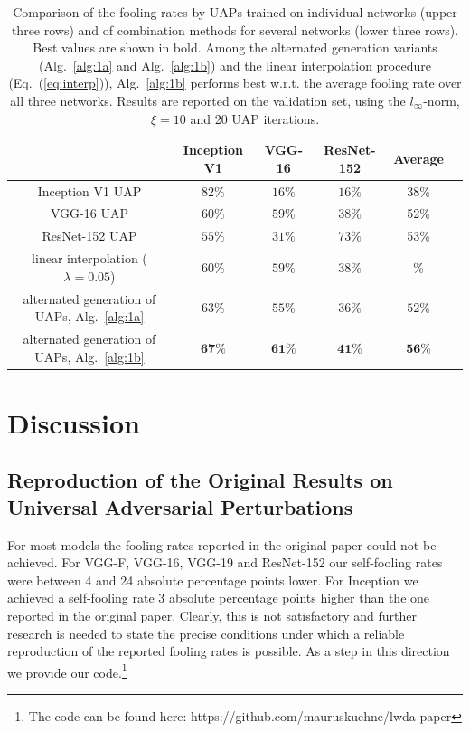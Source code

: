 \documentclass[runningheads]{llncs}
\begin{document}
\begin{table}
\centering

\begin{tabular}{|c|c|c|c|c|c|}
\hline
											&	Inception	V1&	VGG-16		&	ResNet-152	& Average	\\ \hline
Inception V1 UAP							&	\(82\%\)		&	\(16\%\)	&	\(16\%\)	&38\%	\\
VGG-16 UAP								&	\(60\%\)		&	\(59\%\)	&	\(38\%\)	&52\%	\\
ResNet-152 UAP &	\(55\%\)		&	\(31\%\)	&	\(73\%\)&53\%		\\ \hline
linear interpolation (\(\lambda=0.05\))	&	\(60\%\)		&	\(59\%\)	&	\(38\%\)	&\%\\
alternated generation of UAPs, Alg.~\ref{alg:1a}&	\(63\%\)		&	\(55\%\)	&	\(36\%\)	& \(52\%\)	\\
alternated generation of UAPs, Alg.~\ref{alg:1b}&	\(\mathbf{67}\%\)		&	\(\mathbf{61}\%\)	&	\(\mathbf{41}\%\)		&\(\mathbf{56}\)\%\\


\hline 
\end{tabular}

\caption{Comparison of the fooling rates by UAPs trained on individual networks (upper three rows) and of combination methods for several networks (lower three rows). Best values are shown in bold. Among the alternated generation variants (Alg.~\ref{alg:1a} and Alg.~\ref{alg:1b}) and the linear interpolation procedure (Eq.~(\ref{eq:interp})), Alg.~\ref{alg:1b} performs best w.r.t. the average fooling rate over all three networks. Results are reported on the validation set, using the $l_\infty$-norm, $\xi=10$ and 20 UAP iterations.}\label{tab:vergleich_comb}
\end{table}


\section{Discussion}
\subsection{Reproduction of the Original Results on Universal Adversarial Perturbations}
For most models the fooling rates reported in the original paper could not be achieved. For VGG-F, VGG-16, VGG-19 and ResNet-152 our  self-fooling rates were between 4 and 24 absolute percentage points lower. For Inception we achieved a self-fooling rate 3 absolute percentage points higher than the one reported in the original paper. Clearly, this is not satisfactory and further research is needed to state the precise conditions under which a reliable reproduction of the reported fooling rates is possible. As a step in this direction we provide our code.\footnote{The code can be found here: https://github.com/mauruskuehne/lwda-paper}
\end{document}
